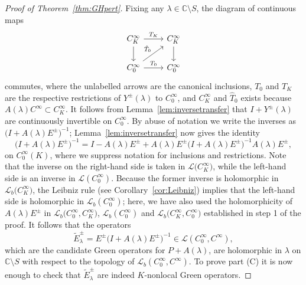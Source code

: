 \documentclass[pdftex]{sigma}
\numberwithin{equation}{section}
\newcommand{\CC}{{\mathbb C}}
\newcommand{\LL}{{\mathcal L}}
\begin{document}
\begin{proof}[Proof of Theorem~\ref{thm:GHpert}]
 	Fixing any $\lambda\in \CC\setminus S$, the diagram of continuous maps
 	\begin{equation*}
 		\begin{tikzcd}
 			C^\infty_K \arrow[r, "T_K"]\arrow[d] & C^\infty_K \arrow[d]\\
 			C_0^\infty \arrow[r, "T_0"]\arrow[ur,"\hat{T}_0"] & C_0^\infty
 		\end{tikzcd}
 	\end{equation*}
 	commutes, where the unlabelled arrows are the canonical inclusions,
 	$T_0$ and $T_K$ are the respective restrictions of $Y^\pm(\lambda)$
 	to $C_0^\infty$, and $C_K^\infty$ and $\hat{T}_0$ exists because
 	$A(\lambda)C^\infty\subset C^\infty_K$.
 	It follows from Lemma~\ref{lem:inversetransfer} that $I+ Y^\pm(\lambda)$ are continuously invertible on $C_0^\infty$. By abuse of notation we write the inverses as $\big(I+ A(\lambda)E^\pm\big)^{-1}$; Lemma~\ref{lem:inversetransfer} now gives the identity
 	\begin{equation}\label{eq:inverseidentity}
 		\big(I+ A(\lambda)E^\pm\big)^{-1} = I - A(\lambda)E^\pm + A(\lambda)E^\pm \big(I+ A(\lambda)E^\pm\big)^{-1} A(\lambda)E^\pm,
 	\end{equation}
 	on $C_0^\infty(K)$, where we suppress notation for inclusions and restrictions. Note that the inverse on the right-hand side is taken in $\LL\big(C^\infty_K\big)$, while the left-hand side is an inverse in $\LL(C^\infty_0)$. Because the former inverse is holomorphic in
 	$\LL_b\big(C^\infty_K\big)$, the Leibniz rule (see Corollary~\ref{cor:Leibniz}) implies that the left-hand side is
 	holomorphic in $\LL_b(C_0^\infty)$; here, we have also used the holomorphicity
 	of~$A(\lambda)E^\pm$ in $\LL_b\big(C_0^\infty,C^\infty_K\big)$, $\LL_b(C_0^\infty)$ and $\LL_b\big(C^\infty_K,C_0^\infty\big)$ established in step 1 of the proof. It follows that the operators
 	\begin{equation*}
 		\tilde{E}^\pm_\lambda= E^\pm \big(I+ A(\lambda)E^\pm\big)^{-1}\in\LL(C_0^\infty, C^\infty),
 	\end{equation*}
 	which are the candidate Green operators for $P+A(\lambda)$,	are holomorphic in $\lambda$ on $\CC\setminus S$ with respect to the topology of $\LL_b(C_0^\infty,C^\infty)$.
 	To prove part (C) it is now enough to check that $\tilde{E}^\pm_\lambda$ are indeed $K$-nonlocal Green operators.
 	

\end{proof}
\end{document}
